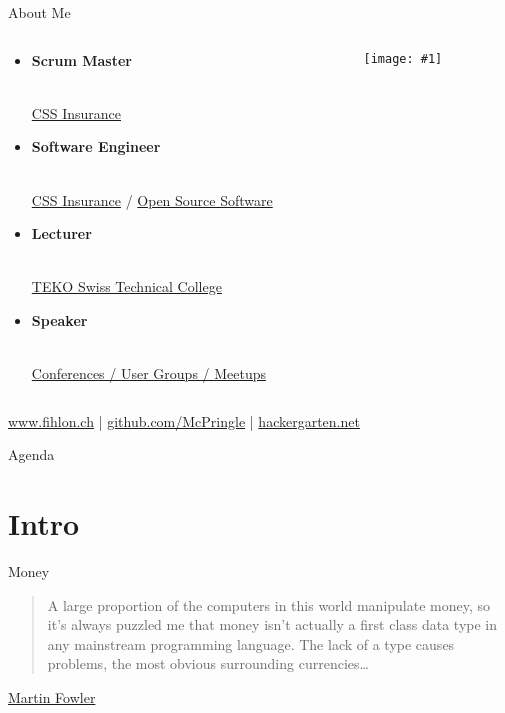 \documentclass{beamer}
\newcommand{\myfig}[2]{
	\begin{minipage}[c]{\textwidth}
		\begin{center}
			\texttt{[image: \#1]}
		\end{center}
		\vspace{3mm}
	\end{minipage}
}
\newcommand{\bb}[1]{\textbf{#1}}
\newcommand{\slideItems}[1]{
	\begin{itemize}
		#1
	\end{itemize}
}
\newcommand{\slide}[2]{
	\begin{frame}{#1}
		#2
	\end{frame}
}
\begin{document}
\slide{About Me}{
	\begin{columns}
    	\begin{column}{5cm}
			\begin{tiny}
				\slideItems{
					\setlength{\itemsep}{12pt}
					\item
						\begin{normalsize}\bb{Scrum Master}\end{normalsize} \\
						\href{https://www.css.ch/}{CSS Insurance}
					\item
						\begin{normalsize}\bb{Software Engineer}\end{normalsize} \\
						\href{https://www.css.ch/}{CSS Insurance} /
						\href{https://github.com/McPringle}{Open Source Software}
					\item
						\begin{normalsize}\bb{Lecturer}\end{normalsize} \\
						\href{http://www.teko.ch/}{TEKO Swiss Technical College}
					\item
						\begin{normalsize}\bb{Speaker}\end{normalsize} \\
						\href{https://www.fihlon.ch/}{Conferences / User Groups / Meetups}
				}
			\end{tiny}
    	\end{column}
	    \begin{column}{5cm}
        	\myfig{McPringle}{0.8}
    	\end{column}
	\end{columns}
	\href{https://www.fihlon.ch}{www.fihlon.ch} |
	\href{https://github.com/McPringle}{github.com/McPringle} |
	\href{http://hackergarten.net}{hackergarten.net}
}

\slide{Agenda}{
	\setcounter{tocdepth}{1}
	\tableofcontents
}

\section{Intro}

\slide{Money}{
	\begin{quote}
		A large proportion of the computers in this world manipulate money, so it’s always puzzled me that money isn’t actually a first class data type in any mainstream programming language. The lack of a type causes problems, the most obvious surrounding currencies…
	\end{quote}
	\tiny{\href{http://martinfowler.com/eaaCatalog/money.html}{Martin Fowler}}
}
\end{document}
